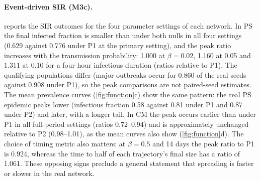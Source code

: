 \paragraph{Event-driven SIR (M3c).}
 reports the SIR outcomes for the four parameter settings of each network.
In PS the final infected fraction is smaller than under both nulls in all four settings
(0.629 against 0.776 under P1 at the primary setting), and the peak ratio increases with
the transmission probability: 1.000 at $\beta=0.02$, 1.160 at 0.05 and 1.311 at 0.10 for a
four-hour infectious duration (ratios relative to P1). The qualifying populations differ
(major outbreaks occur for 0.860 of the real seeds against 0.908 under P1), so the peak
comparisons are not paired-seed estimates. The mean prevalence curves
(\cref{fig:function}c) show the same pattern: the real PS epidemic peaks lower (infectious
fraction 0.58 against 0.81 under P1 and 0.87 under P2) and later, with a longer tail. In CM
the peak occurs earlier than under P1 in all full-period settings (ratios 0.72--0.94) and
is approximately unchanged relative to P2 (0.98--1.01), as the mean curves also show
(\cref{fig:function}d). The choice of timing metric also matters: at $\beta=0.5$ and 14 days the
peak ratio to P1 is 0.924, whereas the time to half of each trajectory's final size has a
ratio of 1.061. These opposing signs preclude a general statement that spreading is faster
or slower in the real network.

